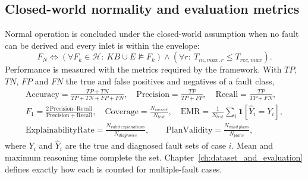 

\subsection{Closed-world normality and evaluation metrics}

Normal operation is concluded under the closed-world assumption when no fault can be derived and every inlet is within the envelope:
\begin{equation}
  F_N \iff \left(\forall F_k \in \mathcal{H}:\ \mathit{KB} \cup E \not\models F_k\right) \wedge \left(\forall r:\ T_{in,max,r} \le T_{rec,max}\right) .
\end{equation}
Performance is measured with the metrics required by the framework. With $\mathit{TP}$, $\mathit{TN}$, $\mathit{FP}$ and $\mathit{FN}$ the true and false positives and negatives of a fault class,
\begin{gather}
  \mathrm{Accuracy} = \frac{\mathit{TP} + \mathit{TN}}{\mathit{TP} + \mathit{TN} + \mathit{FP} + \mathit{FN}} , \quad
  \mathrm{Precision} = \frac{\mathit{TP}}{\mathit{TP} + \mathit{FP}} , \quad
  \mathrm{Recall} = \frac{\mathit{TP}}{\mathit{TP} + \mathit{FN}} , \label{eq:metrics} \\
  F_1 = \frac{2\,\mathrm{Precision}\cdot\mathrm{Recall}}{\mathrm{Precision} + \mathrm{Recall}} , \quad
  \mathrm{Coverage} = \frac{N_{correct}}{N_{test}} , \quad
  \mathrm{EMR} = \frac{1}{N_{test}} \textstyle\sum_i \mathbf{1}[\hat Y_i = Y_i] , \\
  \mathrm{ExplainabilityRate} = \frac{N_{valid\ explanations}}{N_{diagnoses}} , \qquad
  \mathrm{PlanValidity} = \frac{N_{valid\ plans}}{N_{plans}} ,
\end{gather}
where $Y_i$ and $\hat Y_i$ are the true and diagnosed fault sets of case $i$. Mean and maximum reasoning time complete the set. Chapter~\ref{ch:dataset_and_evaluation} defines exactly how each is counted for multiple-fault cases.

